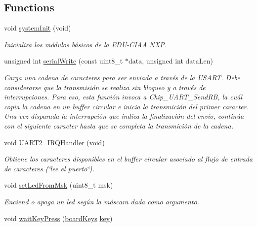 \subsection*{Functions}
\begin{DoxyCompactItemize}
\item 
void \hyperlink{group__hardware_gab11a117f1e08391f23d1da05930e7acf}{system\+Init} (void)
\begin{DoxyCompactList}\small\item\em Inicializa los módulos básicos de la E\+D\+U-\/\+C\+I\+AA N\+XP. \end{DoxyCompactList}\item 
unsigned int \hyperlink{group__hardware_ga461352be081cdef66d03a73226849b41}{serial\+Write} (const uint8\+\_\+t $\ast$data, unsigned int data\+Len)
\begin{DoxyCompactList}\small\item\em Carga una cadena de caracteres para ser enviada a través de la U\+S\+A\+RT. Debe considerarse que la transmisión se realiza sin bloqueo y a través de interrupciones. Para eso, esta función invoca a Chip\+\_\+\+U\+A\+R\+T\+\_\+\+Send\+RB, la cuál copia la cadena en un buffer circular e inicia la transmición del primer caracter. Una vez disparada la interrupción que indica la finalización del envío, continúa con el siguiente caracter hasta que se completa la transmición de la cadena. \end{DoxyCompactList}\item 
void \hyperlink{group__hardware_gac20eca44aeea90e6f603831193cc9b28}{U\+A\+R\+T2\+\_\+\+I\+R\+Q\+Handler} (void)
\begin{DoxyCompactList}\small\item\em Obtiene los caracteres disponibles en el buffer circular asociado al flujo de entrada de caracteres (\char`\"{}lee el puerto\char`\"{}). \end{DoxyCompactList}\item 
void \hyperlink{group__hardware_ga4b6495dfec1dcc97e48043d7bca4da60}{set\+Led\+From\+Msk} (uint8\+\_\+t msk)
\begin{DoxyCompactList}\small\item\em Enciend o apaga un led según la máscara dada como argumento. \end{DoxyCompactList}\item 
void \hyperlink{group__hardware_ga3ac24a1bb2d63482077813f22c6930a1}{wait\+Key\+Press} (\hyperlink{group__hardware_ga8d70125ca4047f0f7ea513cd8568953d}{board\+Keys} \hyperlink{group__operaciones_ga3496dfc7a27df7eead65d48ed89e6867}{key})

\end{DoxyCompactItemize}
